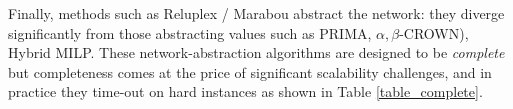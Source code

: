 

Finally, methods such as Reluplex / Marabou \cite{Reluplex,Marabou}  abstract the network: they diverge significantly from those abstracting values such as PRIMA, $\alpha,\beta$-CROWN)\cite{prima,crown}, Hybrid MILP. 
These network-abstraction algorithms are designed to be {\em complete} but completeness comes at the price of significant scalability challenges, and in practice they time-out on hard instances as shown in Table \ref{table_complete}.